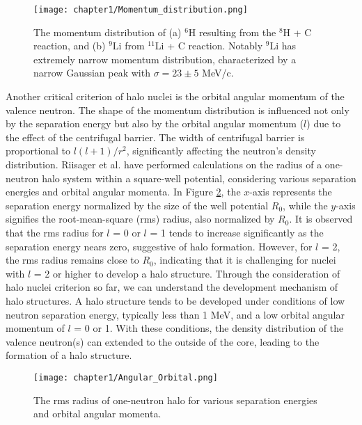 \begin{figure}
    \centering
    \texttt{[image: chapter1/Momentum\_distribution.png]}
    \caption[The momentum distribution of $^{6}$H and $^{9}$Li\cite{Kobayashi88}]{The momentum distribution of (a) $^{6}$H resulting from the $^{8}$H + C reaction, and (b) $^{9}$Li from $^{11}$Li + C reaction. Notably $^{9}$Li has extremely narrow momentum distribution, characterized by a narrow Gaussian peak with $\sigma  = 23 \pm 5$ MeV/c. \cite{Kobayashi88}}
    \label{fig:Momentum_distribution}
\end{figure}

Another critical criterion of halo nuclei is the orbital angular momentum of the valence neutron. The shape of the momentum distribution is influenced not only by the separation energy but also by the orbital angular momentum ($l$) due to the effect of the centrifugal barrier. The width of centrifugal barrier is proportional to $l(l+1)/r^2$, significantly affecting the neutron's density distribution. Riisager et al. \cite{Riisager} have performed calculations on the radius of a one-neutron halo system within a square-well potential, considering various separation energies and orbital angular momenta. In Figure \ref{fig:Angular_Orbital}, the $x$-axis represents the separation energy normalized by the size of the well potential $R_0$, while the $y$-axis signifies the root-mean-square (rms) radius, also normalized by $R_0$.  It is observed that the rms radius for $l$ = 0 or $l$ = 1 tends to increase significantly as the separation energy nears zero, suggestive of halo formation. However, for $l$ = 2, the rms radius remains close to $R_0$, indicating that it is challenging for nuclei with $l$ = 2 or higher to develop a halo structure. Through the consideration of halo nuclei criterion so far, we can understand the development mechanism of halo structures. A halo structure tends to be developed under conditions of low neutron separation energy, typically less than 1 MeV, and a low orbital angular momentum of $l$ = 0 or 1. With these conditions, the density distribution of the valence neutron(s) can extended to the outside of the core, leading to the formation of a halo structure.


\begin{figure}
    \centering
    \texttt{[image: chapter1/Angular\_Orbital.png]}
    \caption{The rms radius of one-neutron halo for various separation energies and orbital angular momenta. \cite{Riisager}}
    \label{fig:Angular_Orbital}
\end{figure}



